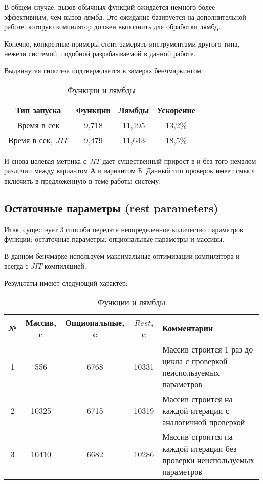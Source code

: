 \documentclass{mipt-thesis-bs}
\begin{document}
В общем случае, вызов обычных функций ожидается немного
более эффективным, чем вызов лямбд. Это ожидание базируется на
дополнительной работе, которую компилятор должен выполнить для обработки лямбд.

Конечно, конкретные примеры стоит замерять инструментами другого типа, нежели
системой, подобной разрабаываемой в данной работе.

Выдвинутая гипотеза подтверждается в замерах бенчмаркингом:

\begin{table}[h]
    \centering
    \begin{tabular}{|c|c|c|c|}
      \hline
      Тип запуска & Функции & Лямбды & Ускорение \\
      \hline
      Время в сек & 9,718 & 11,195 & 13,2\% \\
      \hline
      Время в сек, $JIT$ & 9,479 & 11,643 & 18,5\% \\
      \hline
    \end{tabular}
    \caption{Функции и лямбды}
  \end{table}

И снова целевая метрика с $JIT$ дает существенный прирост в и без того немалом
различии между вариантом А и вариантом Б. Данный тип проверок имеет смысл включить
в предложенную в теме работы систему.

\subsection{Остаточные параметры (rest parameters)}

Итак, существует 3 способа передать неопределенное количество параметров функции:
остаточные параметры, опциональные параметры и массивы.

В данном бенчмарке используем максимальные оптимизации компилятора и всегда с
$JIT$-компиляцией.

Результаты имеют следующий характер:

\begin{table}[h]
    \centering
    \begin{tabularx}{\textwidth}{|c|c|c|c|X|}
      \hline
      № & Массив, c & Опциональные, c & $Rest$, c & Комментарии \\
      \hline
      1 & 556 & 6768 & 10331 &  Массив строится 1 раз до цикла с проверкой неиспользуемых параметров \\
      \hline
      2 & 10325 & 6715 & 10319 &  Массив строится на каждой итерации с аналогичной проверкой\\
      \hline
      3 & 10410 & 6682 & 10286 &  Массив строится на каждой итерации без проверки неиспользуемых параметров\\
      \hline
    \end{tabularx}
    \caption{Функции и лямбды}
  \end{table}
\end{document}

